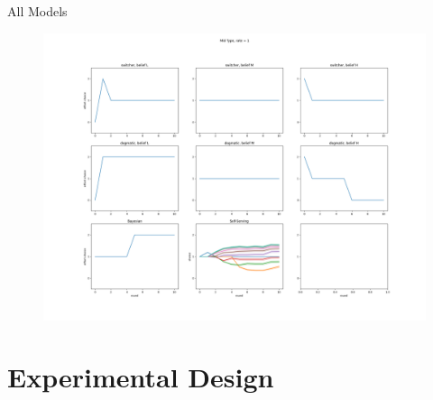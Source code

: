\documentclass[aspectratio=169]{beamer}
\begin{document}
    \begin{frame}{All Models}
    \label{Figure2}
        \begin{figure}
        \centering
        \includegraphics[scale=0.2]{all_11.png}
    \end{figure}     

\end{frame}



\section*{Experimental Design}
\end{document}
